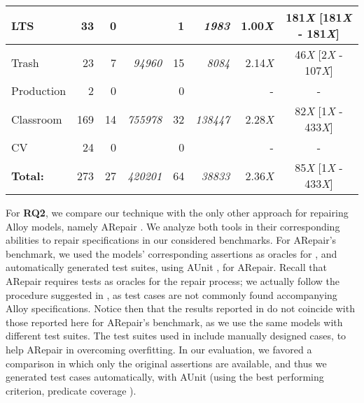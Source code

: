 \begin{table*}[ht]
\begin{center}
\begin{small}
\begin{tabular}{|l|r|r|r|r|r|r|c|}
LTS & 33 & 0 & \textit{} & 1 & \textit{1983} & 1.00\scriptsize{\emph{X}} & 181\scriptsize{\emph{X}} [181\scriptsize{\emph{X}} - 181\scriptsize{\emph{X}}] \\ \hline
Trash & 23 & 7 & \textit{94960} & 15 & \textit{8084} & 2.14\scriptsize{\emph{X}} & 46\scriptsize{\emph{X}} [2\scriptsize{\emph{X}} - 107\scriptsize{\emph{X}}] \\ \hline
Production & 2 & 0 & \textit{} & 0 & \textit{} & - & - \\ \hline
Classroom & 169 & 14 & \textit{755978} & 32 & \textit{138447} & 2.28\scriptsize{\emph{X}} & 82\scriptsize{\emph{X}} [1\scriptsize{\emph{X}} - 433\scriptsize{\emph{X}}] \\ \hline
CV & 24 & 0 & \textit{} & 0 & \textit{} & - & - \\ \hline
\rowcolor{black!5}\textbf{Total:}  & 273 & 27 & \textit{420201} & 64 & \textit{38833} & 2.36\scriptsize{\emph{X}} & 85\scriptsize{\emph{X}} [1\scriptsize{\emph{X}} - 433\scriptsize{\emph{X}}] \\ \hline
\end{tabular}
\end{small}
\end{center}
\label{pruning-vs-no-pruning-experiments}
\end{table*}

For \textbf{RQ2}, we compare our technique with the only other approach for repairing Alloy models, namely ARepair \cite{Wang+2018}. We analyze both tools in their corresponding abilities to repair specifications in our considered benchmarks. For ARepair's benchmark, we used the models' corresponding assertions as oracles for \technique, and automatically generated test suites, using AUnit \cite{Sullivan+2018}, for ARepair. Recall that ARepair requires tests as oracles for the repair process; we actually follow the procedure suggested in \cite{Wang+2018}, as test cases are not commonly found accompanying Alloy specifications. Notice then that the results reported in \cite{Wang+2018} do not coincide with those reported here for ARepair's benchmark, as we use the same models with different test suites. The test suites used in \cite{Wang+2018} include manually designed cases, to help ARepair in overcoming overfitting. In our evaluation, we favored a comparison in which only the original assertions are available, and thus we generated test cases automatically, with AUnit (using the best performing criterion, predicate coverage \cite{Sullivan+2018}). 

